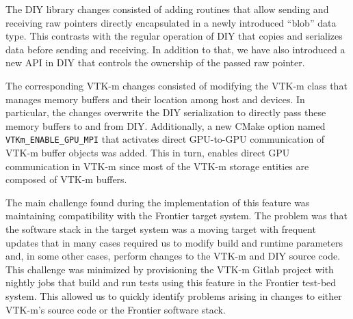 The DIY library changes consisted of adding routines that allow sending and receiving raw pointers directly encapsulated in a newly introduced ``blob'' data type. This contrasts with the regular operation of DIY that copies and serializes data before sending and receiving. In addition to that, we have also introduced a new API in DIY that controls the ownership of the passed raw pointer.

The corresponding VTK-m changes consisted of modifying the VTK-m class that manages memory buffers and their location among host and devices.
In particular, the changes overwrite the DIY serialization to directly pass these memory buffers to and from DIY.
Additionally, a new CMake option named \texttt{VTKm\_ENABLE\_GPU\_MPI} that activates direct GPU-to-GPU communication of VTK-m buffer objects was added.
This in turn, enables direct GPU communication in VTK-m since most of the VTK-m storage entities are composed of VTK-m buffers. 

The main challenge found during the implementation of this feature was maintaining compatibility with the Frontier target system.
The problem was that the software stack in the target system was a moving target with frequent updates that in many cases required us to modify build and runtime parameters and, in some other cases, perform changes to the VTK-m and DIY source code.
This challenge was minimized by provisioning the VTK-m Gitlab project with nightly jobs that build and run tests using this feature in the Frontier test-bed system.
This allowed us to quickly identify problems arising in changes to either VTK-m's source code or the Frontier software stack.
